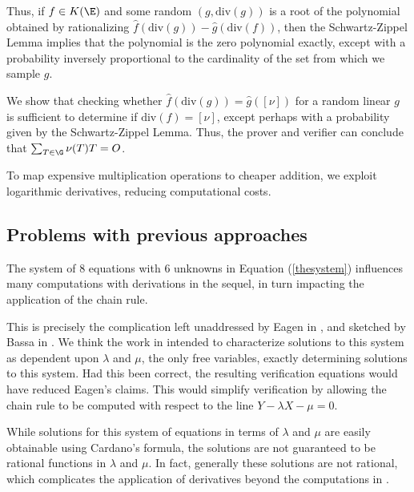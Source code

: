 \documentclass[11pt,letterpaper]{article}
\theoremstyle{definition}
\newcommand{\6}{\mathbf}
\newcommand{\7}{\mathcal}
\begin{document}
Thus, if $f \in K(\E)$ and some random $(g, \text{div}(g))$ is a root of the polynomial obtained by rationalizing $\widehat{f}(\text{div}(g)) - \widehat{g}(\text{div}(f))$, then the Schwartz-Zippel Lemma implies that the polynomial is the zero polynomial exactly, except with a probability inversely proportional to the cardinality of the set from which we sample $g$.

We show that checking whether $\widehat{f}(\text{div}(g)) = \widehat{g}([\nu])$ for a random linear $g$ is sufficient to determine if $\text{div}(f) = [\nu]$, except perhaps with a probability given by the Schwartz-Zippel Lemma. Thus, the prover and verifier can conclude that $\sum_{T \in \G} \nu(T) T = O$. 

To map expensive multiplication operations to cheaper addition, we exploit logarithmic derivatives, reducing computational costs.


\subsection{Problems with previous approaches}
The system of $8$ equations with $6$ unknowns in Equation (\ref{thesystem}) influences many computations with derivations in the sequel, in turn impacting the application of the chain rule. %

This is precisely the complication left unaddressed by Eagen in \cite{Eagen}, and sketched by Bassa in \cite{SoundnessForDLP}.  We think the work in \cite{Eagen} intended to characterize solutions to this system as dependent upon $\lambda$ and $\mu$, the only free variables, exactly determining solutions to this system. Had this been correct, the resulting verification equations would have reduced Eagen's claims. This would simplify verification by allowing the chain rule to be computed with respect to the line $Y - \lambda X - \mu = 0$.

While solutions for this system of equations in terms of $\lambda$ and $\mu$ are easily obtainable using Cardano's formula, the solutions are not guaranteed to be rational functions in $\lambda$ and $\mu$. In fact, generally these solutions are not rational, which complicates the application of derivatives beyond the computations in \cite{Eagen}.
\end{document}
